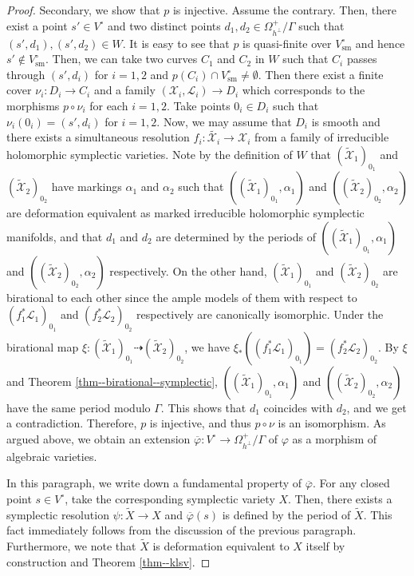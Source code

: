 \documentclass[12pt,twoside]{amsart}
\theoremstyle{definition}
\begin{document}
\begin{proof}
   Secondary, we show that $p$ is injective. Assume the contrary.
   Then, there exist a point $s'\in V^\circ$ and two distinct points $d_1,d_2\in\Omega_{h^{\perp}}^+/\Gamma$ such that $(s',d_1),(s',d_2)\in W$.
   It is easy to see that $p$ is quasi-finite over $V^\circ_{\mathrm{sm}}$ and hence $s'\not\in V^\circ_{\mathrm{sm}}$.
Then, we can take two curves $C_1$ and $C_2$ in $W$ such that $C_i$ passes through $(s',d_i)$ for $i=1,2$ and $p(C_i)\cap V^\circ_{\mathrm{sm}}\ne\emptyset$.
Then there exist a finite cover $\nu_i\colon D_i\to C_i$ and a family $(\mathcal{X}_i,\mathcal{L}_i)\to D_i$ which corresponds to the morphisms $p\circ \nu_i$ for each $i=1,2$.
Take points $0_i\in D_i$ such that $\nu_i(0_i)=(s',d_i)$ for $i=1,2$. 
Now, we may assume that $D_i$ is smooth and there exists a simultaneous resolution $f_i\colon \widetilde{\mathcal{X}_i}\to \mathcal{X}_i$ from a family of irreducible holomorphic symplectic varieties.
Note by the definition of $W$ that $(\widetilde{\mathcal{X}}_1)_{0_1}$ and $(\widetilde{\mathcal{X}}_2)_{0_2}$ have markings $\alpha_1$ and $\alpha_2$ such that $((\widetilde{\mathcal{X}}_1)_{0_1},\alpha_1)$ and $((\widetilde{\mathcal{X}}_2)_{0_2},\alpha_2)$ are deformation equivalent as marked irreducible holomorphic symplectic manifolds, and that $d_1$ and $d_2$ are determined by the periods of $((\widetilde{\mathcal{X}}_1)_{0_1},\alpha_1)$ and $((\widetilde{\mathcal{X}}_2)_{0_2},\alpha_2)$ respectively.
On the other hand, $(\widetilde{\mathcal{X}}_1)_{0_1}$ and $(\widetilde{\mathcal{X}}_2)_{0_2}$ are birational to each other since the ample models of them with respect to $(f_1^*\mathcal{L}_{1})_{0_1}$ and $(f_2^*\mathcal{L}_{2})_{0_2}$ respectively are canonically isomorphic.
Under the birational map $\xi\colon (\widetilde{\mathcal{X}}_1)_{0_1}\dashrightarrow (\widetilde{\mathcal{X}}_2)_{0_2}$, we have $\xi_*((f_1^*\mathcal{L}_{1})_{0_1})=(f_2^*\mathcal{L}_{2})_{0_2}$.
By $\xi$ and Theorem \ref{thm--birational--symplectic}, $((\widetilde{\mathcal{X}}_1)_{0_1},\alpha_1)$ and $((\widetilde{\mathcal{X}}_2)_{0_2},\alpha_2)$ have the same period modulo $\Gamma$.
This shows that $d_1$ coincides with $d_2$, and we get a contradiction. 
Therefore, $p$ is injective, and thus $p\circ\nu$ is an isomorphism. 
As argued above, we obtain an extension $\overline{\varphi}\colon V^\circ\to \Omega^{+}_{h^\perp}/\Gamma$ of $\varphi$ as a morphism of algebraic varieties.

In this paragraph, we write down a fundamental property of $\overline{\varphi}$. For any closed point $s\in V^\circ$, take the corresponding symplectic variety $X$.
Then, there exists a symplectic resolution $\psi\colon \tilde{X}\to X$ and $\overline{\varphi}(s)$ is defined by the period of $\tilde{X}$.
This fact immediately follows from the discussion of the previous paragraph.
Furthermore, we note that $\tilde{X}$ is deformation equivalent to $X$ itself by construction and Theorem \ref{thm--klsv}.



\end{proof}
\end{document}

